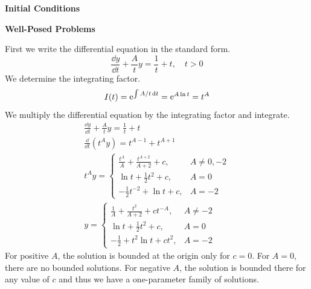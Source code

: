 {  %
  \begin{large}
    \noindent
    \textbf{Initial Conditions}
  \end{large}







  \begin{large}
    \noindent
    \textbf{Well-Posed Problems}
  \end{large}






  \begin{Solution}
    \label{solution t dydt + A y}
    First we write the differential equation in the standard form.
    \[
    \frac{\dd y}{\dd t} + \frac{A}{t} y = \frac{1}{t} + t, \quad t > 0
    \]
    We determine the integrating factor.
    \[
    I(t) = \mathop{\mathrm{e}}\nolimits^{\int A / t \,\mathrm{d} t} = \mathop{\mathrm{e}}\nolimits^{A \ln t} = t^A
    \]
    We multiply the differential equation by the
    integrating factor and integrate.
    \begin{gather*}
      \frac{\dd y}{\dd t} + \frac{A}{t} y = \frac{1}{t} + t 
      \\
      \frac{\dd}{\dd t} \left( t^A y \right) = t^{A-1} + t^{A+1} 
      \\
      t^A y = \begin{cases}
        \frac{t^A}{A} + \frac{t^{A+2}}{A+2} + c, &A \neq 0, -2 
        \\
        \ln t + \frac{1}{2} t^2 + c, &A = 0 
        \\
        - \frac{1}{2} t^{-2} + \ln t + c, &A = -2
      \end{cases} 
      \\
      y = \begin{cases}
        \frac{1}{A} + \frac{t^2}{A+2} + c t^{-A}, &A \neq -2 
        \\
        \ln t + \frac{1}{2} t^2 + c, &A = 0 
        \\
        - \frac{1}{2} + t^2 \ln t + c t^2, &A = -2
      \end{cases}
    \end{gather*}
    For positive $A$, the solution is bounded at the origin only for $c = 0$.
    For $A = 0$, there are no bounded solutions.
    For negative $A$, the solution is bounded there for any value of $c$ and 
    thus we have a one-parameter family of solutions.


\end{Solution}}

